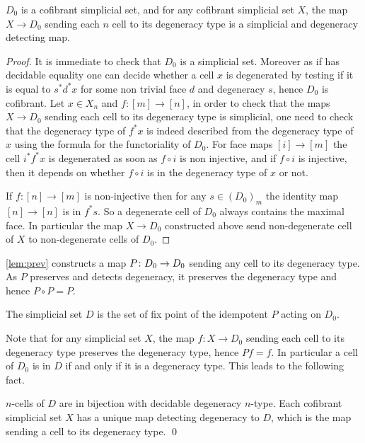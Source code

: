 \documentclass[reqno,10pt,a4paper,oneside,draft]{amsart}
\begin{document}
\begin{lemma} \label{lem:prev}
$D_0$ is a cofibrant simplicial set, and for any cofibrant simplicial set $X$, the map $X \rightarrow D_0$ sending each $n$ cell to its degeneracy type is a simplicial and degeneracy detecting map.
\end{lemma}

\begin{proof}
It is immediate to check that $D_0$ is a simplicial set. Moreover as if has decidable equality one can decide whether a cell $x$ is degenerated by testing if it is equal to $s^* d^* x$ for some non trivial face $d$ and degeneracy $s$, hence $D_0$ is cofibrant. Let $x \in X_n$ and $f:[m] \rightarrow [n]$, in order to check that the maps $X \rightarrow D_0$ sending each cell to its degeneracy type is simplicial, one need to check that the degeneracy type of $f^* x$ is indeed described from the degeneracy type of $x$ using the formula for the functoriality of $D_0$. For face maps $[i] \rightarrow [m]$ the cell $i^* f^* x$ is degenerated as soon as $f \circ i$ is non injective, and if $f\circ i$ is injective, then it depends on whether $f \circ i$ is in the degeneracy type of $x$ or not.

If $f:[n] \rightarrow [m]$ is non-injective then for any $s \in (D_0)_m$ the identity map $[n] \rightarrow [n]$ is in $f^* s$. So a degenerate cell of $D_0$ always contains the maximal face. In particular the map $X \rightarrow D_0$ constructed above send non-degenerate cell of $X$ to non-degenerate cells of $D_0$.

\end{proof}

\cref{lem:prev} constructs a map $P \colon D_0 \rightarrow D_0$ sending any cell to its degeneracy type. As $P$ preserves and detects degeneracy, it preserves the degeneracy type and hence $P \circ P =P$.

\begin{definition}
The simplicial set $D$ is the set of fix point of the idempotent $P$ acting on $D_0$.
\end{definition}

Note that for any simplicial set $X$, the map $f:X \rightarrow D_0$ sending each cell to its degeneracy type preserves the degeneracy type, hence $P f = f$. In particular a cell of $D_0$ is in $D$ if and only if it is a degeneracy type. This leads to the following fact. 

\begin{lemma}
$n$-cells of $D$ are in bijection with decidable degeneracy $n$-type. Each cofibrant simplicial set $X$ has a unique map detecting degeneracy to $D$, which is the map sending a cell to its degeneracy type. \qed
\end{lemma}
\end{document}
